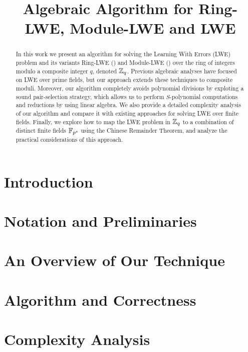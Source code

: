 \documentclass[11pt,letterpaper]{article}
\title{Algebraic Algorithm for Ring-LWE, Module-LWE and LWE} %
\date{}
\begin{document}
\maketitle

\begin{abstract}
In this work we present an algorithm for solving the Learning With Errors (LWE) problem and its variants Ring-LWE (\rlwe) and Module-LWE (\mlwe) over the ring of integers modulo a composite integer \(q\), denoted \(\mathbb{Z}_q\). Previous algebraic analyses have focused on LWE over prime fields, but our approach extends these techniques to composite moduli. Moreover, our algorithm completely avoids polynomial divisions by exploting a sound pair-selection strategy, which allows us to perform $S$-polynomial computations and reductions by using linear algebra. We also provide a detailed complexity analysis of our algorithm and compare it with existing approaches for solving LWE over finite fields. Finally, we explore how to map the LWE problem in \(\mathbb{Z}_q\) to a combination of distinct finite fields \(\mathbb{F}_{p^e}\) using the Chinese Remainder Theorem, and analyze the practical considerations of this approach.
\end{abstract}

\section{Introduction}


\section{Notation and Preliminaries}


\section{An Overview of Our Technique}


\section{Algorithm and Correctness}


\section{Complexity Analysis}

%
\end{document}
